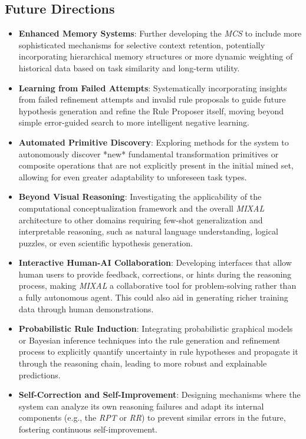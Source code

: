 \documentclass[12pt]{article}
\newcommand{\MIXAL}{\textit{MIXAL}}
\newcommand{\rpt}{\textit{RPT}}
\newcommand{\mcs}{\textit{MCS}}
\newcommand{\rr}{\textit{RR}}
\begin{document}
\subsection{Future Directions}
\begin{itemize}[noitemsep,topsep=0pt]
\item\textbf{Enhanced Memory Systems}: Further developing the \mcs{} to include more sophisticated mechanisms for selective context retention, potentially incorporating hierarchical memory structures or more dynamic weighting of historical data based on task similarity and long-term utility.
\item\textbf{Learning from Failed Attempts}: Systematically incorporating insights from failed refinement attempts and invalid rule proposals to guide future hypothesis generation and refine the Rule Proposer itself, moving beyond simple error-guided search to more intelligent negative learning.
\item\textbf{Automated Primitive Discovery}: Exploring methods for the system to autonomously discover *new* fundamental transformation primitives or composite operations that are not explicitly present in the initial mined set, allowing for even greater adaptability to unforeseen task types.
\item\textbf{Beyond Visual Reasoning}: Investigating the applicability of the computational conceptualization framework and the overall \MIXAL{} architecture to other domains requiring few-shot generalization and interpretable reasoning, such as natural language understanding, logical puzzles, or even scientific hypothesis generation.
\item\textbf{Interactive Human-AI Collaboration}: Developing interfaces that allow human users to provide feedback, corrections, or hints during the reasoning process, making \MIXAL{} a collaborative tool for problem-solving rather than a fully autonomous agent. This could also aid in generating richer training data through human demonstrations.
\item\textbf{Probabilistic Rule Induction}: Integrating probabilistic graphical models or Bayesian inference techniques into the rule generation and refinement process to explicitly quantify uncertainty in rule hypotheses and propagate it through the reasoning chain, leading to more robust and explainable predictions.
\item\textbf{Self-Correction and Self-Improvement}: Designing mechanisms where the system can analyze its own reasoning failures and adapt its internal components (e.g., the \rpt{} or \rr{}) to prevent similar errors in the future, fostering continuous self-improvement.
\end{itemize}
\end{document}
